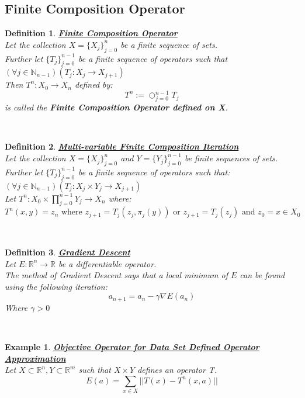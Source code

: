 \documentclass[12pt]{extarticle}
\theoremstyle{plain}
\theoremstyle{plain}
\theoremstyle{plain}
\theoremstyle{Definition}
\newtheorem{def.}{Definition}[section]
\theoremstyle{Definition}
\theoremstyle{plain}
\newtheorem{exmp}{Example}[section]
\theoremstyle{plain}
\newcommand{\cut}[0]{\noindent\framebox[\linewidth]{\rule{\linewidth}{2pt}}\\}
\begin{document}
\subsection{Finite Composition Operator}
\begin{def.} \underline{\textbf{Finite Composition Operator}} \\ 
	Let the collection $X = \{X_j\}_{j=0}^{n}$ be a finite sequence of sets. \\ 
	Further let $\{T_j\}_{j=0}^{n-1}$ be a finite sequence of operators such that $(\forall j \in \mathbb{N}_{n-1})(T_j : X_j \to X_{j+1})$ \\ 
	Then $T^n : X_0 \to X_{n}$ defined by: 
	$$T^n := \bigcirc_{j=0}^{n-1} T_j$$ 
	is called the \textbf{Finite Composition Operator defined on X}. \\ 
\end{def.}
\cut
\begin{def.} \underline{\textbf{Multi-variable Finite Composition Iteration}} \\ 
	Let the collection $X = \{X_j\}_{j=0}^n$ and $Y = \{Y_j\}_{j=0}^{n-1}$ be finite sequences of sets. \\ 
	Further let $\{T_j\}_{j=0}^{n-1}$ be a finite sequence of operators such that: $(\forall j \in \mathbb{N}_{n-1})(T_j : X_j \times Y_j \to X_{j+1})$ \\
	Let $T^n : X_0 \times \prod_{j=0}^{n-1}Y_j \to X_n$ where: \\ 
	$$T^n (x,y) = z_n \text{ where } z_{j+1} = T_j( z_{j},\pi_j (y) ) \text{ or } z_{j+1} = T_j( z_{j} )  \text{ and } z_0 = x \in X_0$$
\end{def.}
\cut
\begin{def.} \underline{\textbf{Gradient Descent}} \\ 
Let $E : \mathbb{R}^n \to \mathbb{R}$ be a differentiable operator. \\ 
The method of Gradient Descent says that a local minimum of $E$ can be found using the following iteration: \\ 
$$a_{n+1} = a_n - \gamma \nabla E(a_n)$$
Where $\gamma > 0$ \\ 
\end{def.}
\cut
\begin{exmp} \underline{\textbf{Objective Operator for Data Set Defined Operator Approximation}} \\ 		
Let $X \subset \mathbb{R}^n, Y \subset \mathbb{R}^m$ such that $X\times Y$ defines an operator T. \\ 
$$E(a) = \sum_{x \in X} ||T(x) - T^n(x,a)||$$ 
\end{exmp}
\cut
\end{document}
